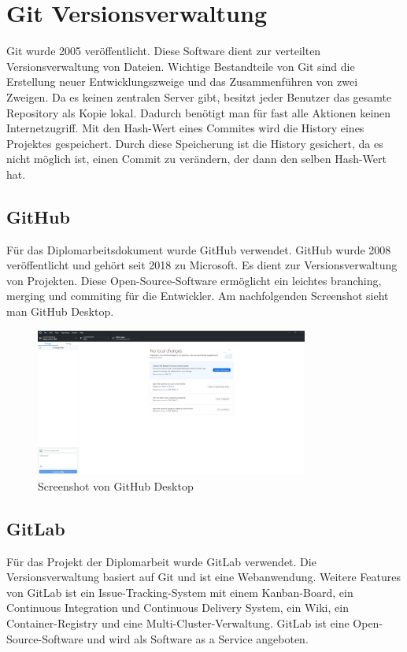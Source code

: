 \section{Git Versionsverwaltung}
Git wurde 2005 veröffentlicht. Diese Software dient zur verteilten Versionsverwaltung von Dateien. Wichtige Bestandteile von Git sind die Erstellung neuer Entwicklungszweige und das Zusammenführen von zwei Zweigen. Da es keinen zentralen Server gibt, besitzt jeder Benutzer das gesamte Repository als Kopie lokal. Dadurch benötigt man für fast alle Aktionen keinen Internetzugriff. Mit den Hash-Wert eines Commites wird die History eines Projektes gespeichert. Durch diese Speicherung ist die History gesichert, da es nicht möglich ist, einen Commit zu verändern, der dann den selben Hash-Wert hat. \autocite{wikiGit}
\subsection{GitHub}
Für das Diplomarbeitsdokument wurde GitHub verwendet. GitHub wurde 2008 veröffentlicht und gehört seit 2018 zu Microsoft. Es dient zur Versionsverwaltung von Projekten. Diese Open-Source-Software ermöglicht ein leichtes branching, merging und commiting für die Entwickler. \autocite{wikiGitHub}
Am nachfolgenden Screenshot sieht man GitHub Desktop.
\begin{figure}[h]
	\centerline{
		\includegraphics[width=0.8\textwidth]{./grafiken/github_screen.png}
	}
	\vskip0pt
	\caption{Screenshot von GitHub Desktop} \label{fig:postman}
\end{figure}
\subsection{GitLab}
Für das Projekt der Diplomarbeit wurde GitLab verwendet. Die Versionsverwaltung basiert auf Git und ist eine Webanwendung. Weitere Features von GitLab ist ein Issue-Tracking-System mit einem Kanban-Board, ein Continuous Integration und Continuous Delivery System, ein Wiki, ein Container-Registry und eine Multi-Cluster-Verwaltung. GitLab ist eine Open-Source-Software und wird als Software as a Service angeboten. \autocite{wikiGitLab}


